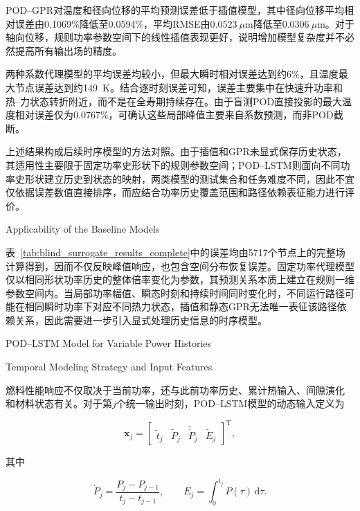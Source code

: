 POD--GPR对温度和径向位移的平均预测误差低于插值模型，其中径向位移平均相对误差由0.1069\%降低至0.0594\%，平均RMSE由$0.0523~\mu$m降低至$0.0306~\mu$m。对于轴向位移，规则功率参数空间下的线性插值表现更好，说明增加模型复杂度并不必然提高所有输出场的精度。

两种系数代理模型的平均误差均较小，但最大瞬时相对误差达到约6\%，且温度最大节点误差达到约149~K。结合逐时刻误差可知，误差主要集中在快速升功率和热--力状态转折附近，而不是在全寿期持续存在。由于盲测POD直接投影的最大温度相对误差仅为0.0767\%，可确认这些局部峰值主要来自系数预测，而非POD截断。

上述结果构成后续时序模型的方法对照。由于插值和GPR未显式保存历史状态，其适用性主要限于固定功率史形状下的规则参数空间；POD--LSTM则面向不同功率史形状建立历史到状态的映射，两类模型的测试集合和任务难度不同，因此不宜仅依据误差数值直接排序，而应结合功率历史覆盖范围和路径依赖表征能力进行评价。

{Applicability of the Baseline Models}

表~\ref{tab:blind_surrogate_results_complete}中的误差均由5717个节点上的完整场计算得到，因而不仅反映峰值响应，也包含空间分布恢复误差。固定功率代理模型仅以相同形状功率历史的整体倍率变化为参数，其预测关系本质上建立在规则一维参数空间内。当局部功率幅值、瞬态时刻和持续时间同时变化时，不同运行路径可能在相同瞬时功率下对应不同热力状态，插值和静态GPR无法唯一表征该路径依赖关系，因此需要进一步引入显式处理历史信息的时序模型。

{POD--LSTM Model for Variable Power Histories}

{Temporal Modeling Strategy and Input Features}

燃料性能响应不仅取决于当前功率，还与此前功率历史、累计热输入、间隙演化
和材料状态有关。对于第$j$个统一输出时刻，POD--LSTM模型的动态输入定义为

\begin{equation}
	\boldsymbol x_j
	=
	\begin{bmatrix}
		\widetilde t_j &
		\widetilde P_j &
		\widetilde{\dot P}_j &
		\widetilde E_j
	\end{bmatrix}^{\mathrm T},
	\label{eq:formal_lstm_features}
\end{equation}

其中

\begin{equation}
	\dot P_j
	=
	\frac{P_j-P_{j-1}}{t_j-t_{j-1}},
	\qquad
	E_j
	=
	\int_0^{t_j}P(\tau)\,\mathrm d\tau.
	\label{eq:formal_power_derivative_energy}
\end{equation}

